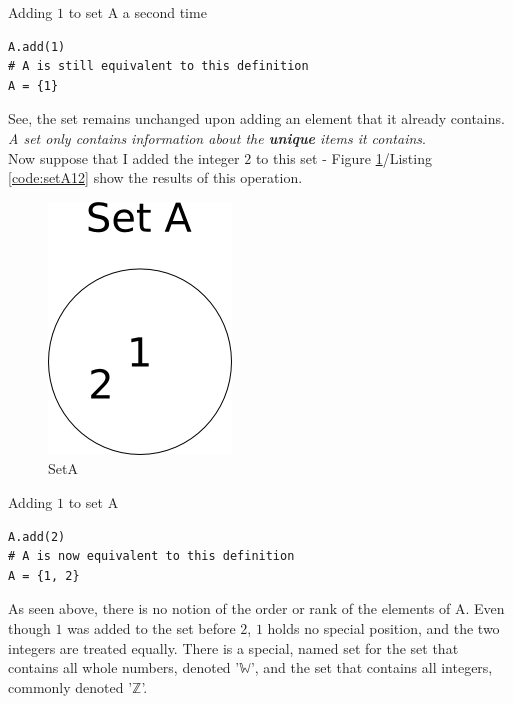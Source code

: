 \begin{listing}[h]
\caption{Adding $1$ to set A a second time}\label{code:setA1_0}
\begin{verbatim}
A.add(1)
# A is still equivalent to this definition
A = {1}
\end{verbatim}
\end{listing}

See, the set remains unchanged upon adding an element that it already contains. \emph{A set only contains information about the \textbf{unique} items it contains}. \\
Now suppose that I added the integer $2$ to this set - Figure \ref{fig:setA12}/Listing \ref{code:setA12} show the results of this operation.

\begin{center}
\begin{figure}
\caption{SetA} \label{fig:setA12}
\includegraphics[scale=0.5]{figures/setA12.png}
\end{figure}
\end{center}

\begin{listing}[h]
\caption{Adding $1$ to set A}\label{code:setA12}
\begin{verbatim}
A.add(2)
# A is now equivalent to this definition
A = {1, 2}
\end{verbatim}
\end{listing}

As seen above, there is no notion of the order or rank of the elements of A. Even though $1$ was added to the set before $2$, $1$ holds no special position, and the two integers are treated equally. There is a special, named set for the set that contains all whole numbers, denoted '$\mathbb{W}$', and the set that contains all integers, commonly denoted '$\mathbb{Z}$'.

